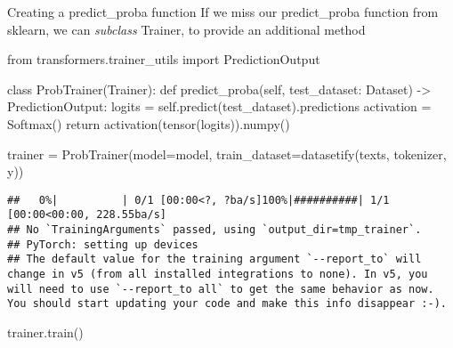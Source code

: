 \documentclass[
  10pt,
  ignorenonframetext,
  aspectratio=169]{beamer}
\newenvironment{Shaded}{\begin{snugshade}}{\end{snugshade}}
\newcommand{\ControlFlowTok}[1]{\textcolor[rgb]{0.94,0.87,0.69}{#1}}
\newcommand{\ImportTok}[1]{\textcolor[rgb]{0.80,0.80,0.80}{#1}}
\newcommand{\KeywordTok}[1]{\textcolor[rgb]{0.94,0.87,0.69}{#1}}
\newcommand{\NormalTok}[1]{\textcolor[rgb]{0.80,0.80,0.80}{#1}}
\newcommand{\OperatorTok}[1]{\textcolor[rgb]{0.94,0.94,0.82}{#1}}
\newcommand{\VariableTok}[1]{\textcolor[rgb]{0.80,0.80,0.80}{#1}}
\begin{document}
\begin{frame}[fragile]{Creating a predict\_proba function}
\protect\hypertarget{creating-a-predict_proba-function}{}
If we miss our predict\_proba function from sklearn, we can
\emph{subclass} Trainer, to provide an additional method

\medskip
\scriptsize

\begin{Shaded}
\begin{Highlighting}[]
\ImportTok{from}\NormalTok{ transformers.trainer\_utils }\ImportTok{import}\NormalTok{ PredictionOutput}

\KeywordTok{class}\NormalTok{ ProbTrainer(Trainer):}
    \KeywordTok{def}\NormalTok{ predict\_proba(}\VariableTok{self}\NormalTok{, test\_dataset: Dataset) }\OperatorTok{{-}\textgreater{}}\NormalTok{ PredictionOutput:}
\NormalTok{        logits }\OperatorTok{=} \VariableTok{self}\NormalTok{.predict(test\_dataset).predictions}
\NormalTok{        activation }\OperatorTok{=}\NormalTok{ Softmax()}
        \ControlFlowTok{return}\NormalTok{ activation(tensor(logits)).numpy()}


\NormalTok{trainer }\OperatorTok{=}\NormalTok{ ProbTrainer(model}\OperatorTok{=}\NormalTok{model, train\_dataset}\OperatorTok{=}\NormalTok{datasetify(texts, tokenizer, y))}
\end{Highlighting}
\end{Shaded}

\begin{verbatim}
##   0%|          | 0/1 [00:00<?, ?ba/s]100%|##########| 1/1 [00:00<00:00, 228.55ba/s]
## No `TrainingArguments` passed, using `output_dir=tmp_trainer`.
## PyTorch: setting up devices
## The default value for the training argument `--report_to` will change in v5 (from all installed integrations to none). In v5, you will need to use `--report_to all` to get the same behavior as now. You should start updating your code and make this info disappear :-).
\end{verbatim}

\begin{Shaded}
\begin{Highlighting}[]
\NormalTok{trainer.train()}
\end{Highlighting}
\end{Shaded}


\end{frame}
\end{document}
